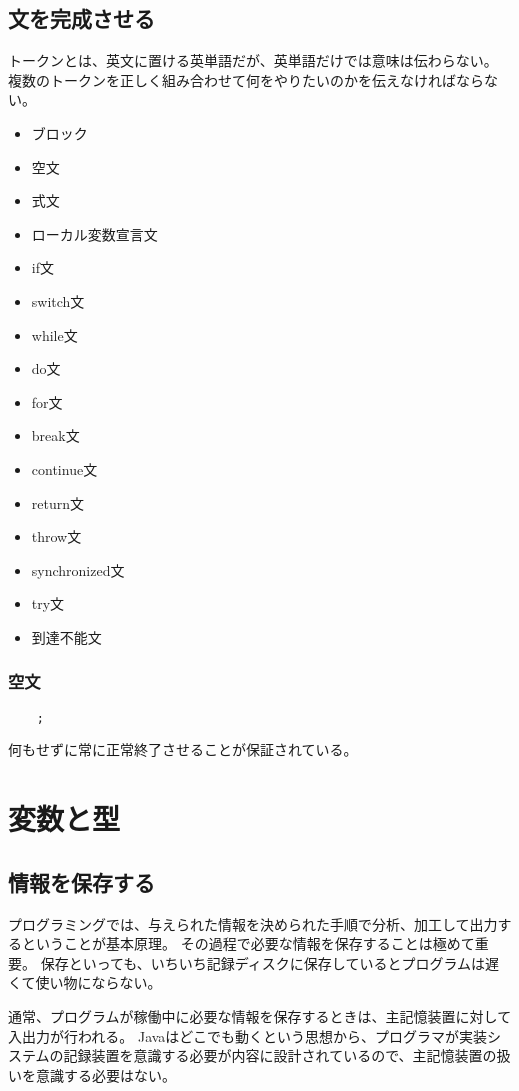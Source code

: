 \documentclass[12pt,a4j,twoside]{jsbook}
\begin{document}
\subsection{文を完成させる}
トークンとは、英文に置ける英単語だが、英単語だけでは意味は伝わらない。
複数のトークンを正しく組み合わせて何をやりたいのかを伝えなければならない。
\begin{itemize}
    \item ブロック
    \item 空文
    \item 式文
    \item ローカル変数宣言文
    \item if文
    \item switch文
    \item while文
    \item do文
    \item for文
    \item break文
    \item continue文
    \item return文
    \item throw文
    \item synchronized文
    \item try文
    \item 到達不能文
\end{itemize}
\subsubsection*{空文}
\begin{lstlisting}
    ;
\end{lstlisting}
何もせずに常に正常終了させることが保証されている。
\section{変数と型}
\subsection{情報を保存する}
プログラミングでは、与えられた情報を決められた手順で分析、加工して出力するということが基本原理。
その過程で必要な情報を保存することは極めて重要。
保存といっても、いちいち記録ディスクに保存しているとプログラムは遅くて使い物にならない。

通常、プログラムが稼働中に必要な情報を保存するときは、主記憶装置に対して入出力が行われる。
Javaはどこでも動くという思想から、プログラマが実装システムの記録装置を意識する必要が内容に設計されているので、主記憶装置の扱いを意識する必要はない。
\end{document}
